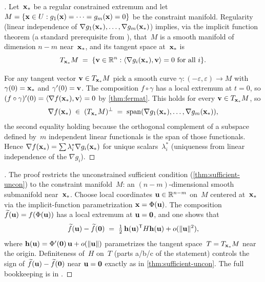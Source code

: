\begin{proof}[]
Let~$\mathbf{x}_*$ be a regular constrained extremum and let
$M = \{\mathbf{x} \in U : g_1(\mathbf{x}) = \dots = g_m(\mathbf{x}) = 0\}$
be the constraint manifold. Regularity (linear independence of
$\nabla g_1(\mathbf{x}_*), \dots, \nabla g_m(\mathbf{x}_*)$) implies, via
the implicit function theorem (a standard prerequisite from
\cite{Zorich1981}), that~$M$ is a smooth manifold of dimension
$n - m$ near~$\mathbf{x}_*$, and its tangent space at~$\mathbf{x}_*$ is
\[
  T_{\mathbf{x}_*} M \;=\; \{\mathbf{v} \in \mathbb{R}^n : \langle \nabla g_i(\mathbf{x}_*), \mathbf{v} \rangle = 0 \text{ for all } i\}.
\]

For any tangent vector $\mathbf{v} \in T_{\mathbf{x}_*} M$ pick a smooth
curve $\gamma \colon (-\varepsilon, \varepsilon) \to M$ with
$\gamma(0) = \mathbf{x}_*$ and $\gamma'(0) = \mathbf{v}$. The composition
$f \circ \gamma$ has a local extremum at $t = 0$, so
$(f \circ \gamma)'(0) = \langle \nabla f(\mathbf{x}_*), \mathbf{v} \rangle = 0$
by \cref{thm:fermat}. This holds for every
$\mathbf{v} \in T_{\mathbf{x}_*} M$, so
\[
  \nabla f(\mathbf{x}_*) \;\in\; (T_{\mathbf{x}_*} M)^{\perp}
  \;=\; \operatorname{span}(\nabla g_1(\mathbf{x}_*), \dots, \nabla g_m(\mathbf{x}_*)),
\]
the second equality holding because the orthogonal complement of a
subspace defined by~$m$ independent linear functionals is the span of
those functionals. Hence
$\nabla f(\mathbf{x}_*) = \sum \lambda_i^* \nabla g_i(\mathbf{x}_*)$ for
unique scalars~$\lambda_i^*$ (uniqueness from linear independence of
the $\nabla g_i$).
\end{proof}

\begin{proof}[]
The proof restricts the unconstrained sufficient condition
(\cref{thm:sufficient-uncon}) to the constraint manifold~$M$: an
$(n - m)$-dimensional smooth submanifold near~$\mathbf{x}_*$. Choose
local coordinates $\mathbf{u} \in \mathbb{R}^{n - m}$ on~$M$ centered
at~$\mathbf{x}_*$ via the implicit-function parametrization
$\mathbf{x} = \Phi(\mathbf{u})$. The composition
$\widetilde{f}(\mathbf{u}) = f(\Phi(\mathbf{u}))$ has a local extremum
at $\mathbf{u} = \mathbf{0}$, and one shows that
\[
  \widetilde{f}(\mathbf{u}) - \widetilde{f}(\mathbf{0}) \;=\; \tfrac{1}{2}\, \mathbf{h}(\mathbf{u})^{\mathsf{T}} H \mathbf{h}(\mathbf{u}) + o(\|\mathbf{u}\|^2),
\]
where $\mathbf{h}(\mathbf{u}) = \Phi'(\mathbf{0})\,\mathbf{u} + o(\|\mathbf{u}\|)$
parametrizes the tangent space~$T = T_{\mathbf{x}_*} M$ near the origin.
Definiteness of~$H$ on~$T$ (parts a/b/c of the statement) controls
the sign of $\widetilde{f}(\mathbf{u}) - \widetilde{f}(\mathbf{0})$ near
$\mathbf{u} = \mathbf{0}$ exactly as in \cref{thm:sufficient-uncon}.
The full bookkeeping is in \cite{Zorich1981}.
\end{proof}

